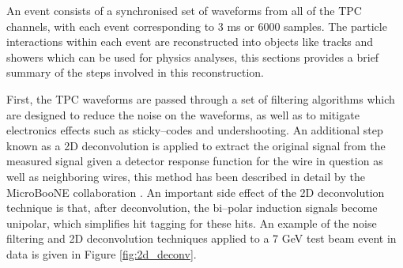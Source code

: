 
An event consists of a synchronised set of waveforms from all of the TPC 
channels, with each event corresponding to 3 ms or 6000 samples. The particle
interactions within each event are reconstructed into objects like tracks and
showers which can be used for physics analyses, this sections provides a brief 
summary of the steps involved in this reconstruction.

First, the TPC waveforms are passed through a set of filtering algorithms which
are designed to reduce the noise on the waveforms, as well as to mitigate 
electronics effects such as sticky--codes and undershooting. An additional step
known as a 2D deconvolution is applied to extract the original signal from the
measured signal given a detector response function for the wire in question as
well as neighboring wires, this method has been described in detail by the 
MicroBooNE collaboration \cite{Adams:2018dra}. An important side
effect of the 2D deconvolution technique is that, after deconvolution, the
bi--polar induction signals become unipolar, which simplifies hit tagging for
these hits. An example of the noise filtering and 2D deconvolution techniques 
applied to a 7 GeV test beam event in \protodune{} data is given in Figure 
\ref{fig:2d_deconv}. 

